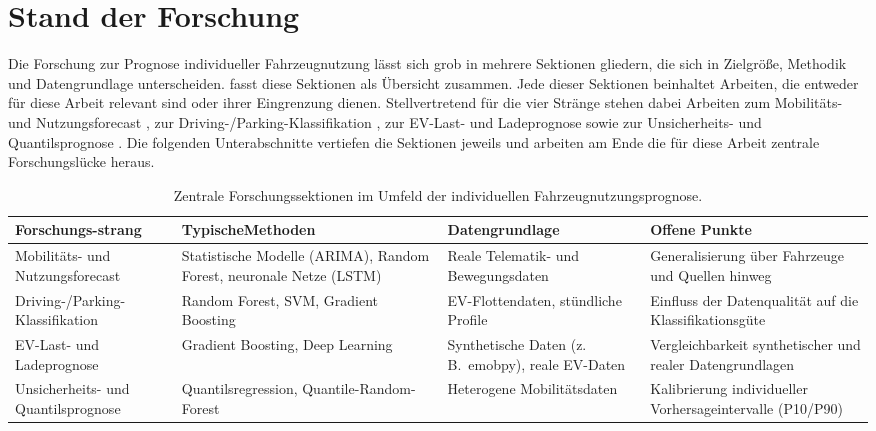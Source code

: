 \section{Stand der Forschung}
\label{sec:stand_forschung}

Die Forschung zur Prognose individueller Fahrzeugnutzung lässt sich grob in mehrere Sektionen gliedern, die sich in Zielgröße, Methodik und Datengrundlage unterscheiden.  fasst diese Sektionen als Übersicht zusammen. Jede dieser Sektionen beinhaltet Arbeiten, die entweder für diese Arbeit relevant sind oder ihrer Eingrenzung dienen. Stellvertretend für die vier Stränge stehen dabei Arbeiten zum Mobilitäts- und Nutzungsforecast \parencite{lindroth2024online,individual2025activitychain}, zur Driving-/Parking-Klassifikation \parencite{kumar2023driving,su2025parking}, zur EV-Last- und Ladeprognose \parencite{sanami2025demand,amaraouali2025quantifying} sowie zur Unsicherheits- und Quantilsprognose \parencite{ali2024location,amaraouali2025quantifying}. Die folgenden Unterabschnitte vertiefen die Sektionen jeweils und arbeiten am Ende die für diese Arbeit zentrale Forschungslücke heraus.

\vspace{1cm}

\begin{table}[H]
  \caption{Zentrale Forschungssektionen im Umfeld der individuellen
  Fahrzeugnutzungsprognose.}
  \label{tab:forschungssektionen}
  \centering
  \begin{tabularx}{\textwidth}{@{}>{\raggedright\arraybackslash}p{3.1cm} X X X@{}}
    \toprule
    \textbf{Forschungs\newline -strang} & \textbf{Typische\newline Methoden} &
    \textbf{Datengrundlage} & \textbf{Offene Punkte} \\
    \midrule
    Mobilitäts- und Nutzungsforecast & Statistische Modelle (ARIMA),
    Random Forest, neuronale Netze (LSTM) & Reale Telematik- und
\newline    Bewegungsdaten & Generalisierung über Fahrzeuge und Quellen hinweg \\
    \addlinespace
    Driving-/Parking-Klassifikation & Random Forest, SVM, Gradient
    Boosting & EV-Flottendaten, stündliche Profile & Einfluss der
    Datenqualität auf die Klassifikationsgüte \\
    \addlinespace
    EV-Last- und Ladeprognose & Gradient Boosting, Deep Learning &
    Synthetische Daten (z.\,B.\ emobpy), reale EV-Daten & Vergleichbarkeit
    synthetischer und realer Datengrundlagen \\
    \addlinespace
    Unsicherheits- und Quantilsprognose & Quantilsregression,
    Quantile-Random-Forest & Heterogene \newline Mobilitätsdaten & Kalibrierung
    individueller Vorhersageintervalle (P10/P90) \\
    \bottomrule
  \end{tabularx}

\end{table}


